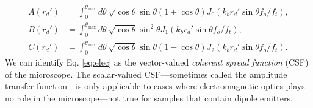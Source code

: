 \documentclass[11pt]{article}
\begin{document}
\begin{align}
  A(r_d') &= \int_0^{\theta_{\text{max}}}d\theta\ \sqrt{\cos\theta}\sin\theta(1+\cos\theta)J_0(k_b r_d'\sin\theta f_o/f_t),\\%
  B(r_d') &= \int_0^{\theta_{\text{max}}}d\theta\ \sqrt{\cos\theta}\sin^2\theta J_1(k_b r_d'\sin\theta f_o/f_t),\\%
  C(r_d') &= \int_0^{\theta_{\text{max}}}d\theta\ \sqrt{\cos\theta}\sin\theta(1-\cos\theta)J_2(k_b r_d'\sin\theta f_o/f_t).%
\end{align}
We can identify Eq. \ref{eq:elec} as the vector-valued \textit{coherent spread
  function} (CSF) of the microscope. The scalar-valued CSF---sometimes called
the amplitude transfer function---is only applicable to cases where
electromagnetic optics plays no role in the microscope---not true
for samples that contain dipole emitters. 
\end{document}
